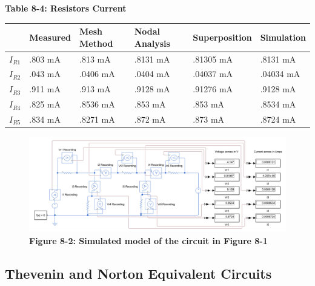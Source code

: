 \documentclass[a4paper]{article}
\begin{document}
\begin{center}
    \small\textbf{Table 8-4: Resistors Current}
    \begin{tabular}{|p{2 cm}|p{2cm}|p{2 cm}|p{2 cm}|p{2 cm}|p{2 cm}|}
        \hline
         & Measured & Mesh Method & Nodal Analysis & Superposition & Simulation \\
        \hline
        $I_{R1}$ & .803 mA  & .813 mA & .8131 mA & .81305 mA &.8131 mA \\
        \hline
        $I_{R2}$ & .043 mA & .0406 mA & .0404 mA & .04037 mA  & .04034 mA\\
        \hline
        $I_{R3}$ & .911 mA & .913 mA & .9128 mA & .91276 mA & .9128 mA \\
        \hline
        $I_{R4}$ &.825 mA & .8536 mA & .853 mA &  .853 mA & .8534 mA\\
        \hline
        $I_{R5}$ & .834 mA & .8271 mA & .872 mA & .873 mA & .8724 mA\\
        \hline
    \end{tabular}
\end{center}

\begin{center}
    \begin{figure}[H]\label{fig8-2}
        \begin{center}
            \includegraphics[width = 16 cm]{Figure_8-1}\\
            \small\textbf{Figure 8-2: Simulated model of the circuit in Figure 8-1}\\    
        \end{center}
    \end{figure}
\end{center}

\pagebreak

\subsection{Thevenin and Norton Equivalent Circuits}
\end{document}
